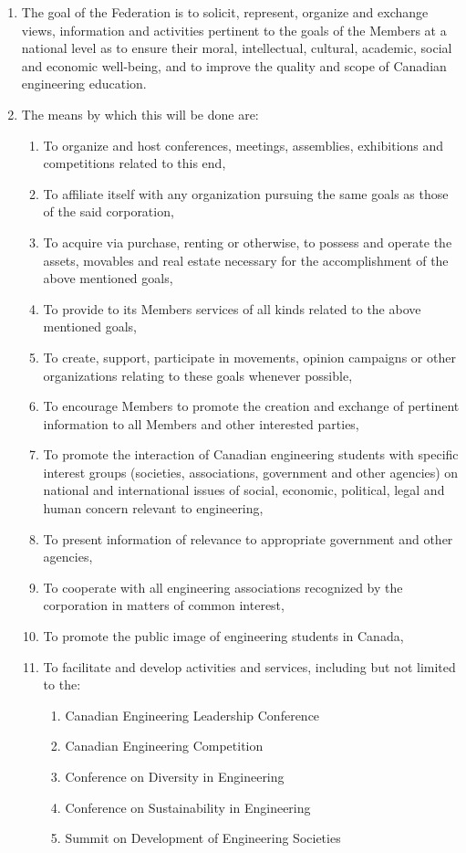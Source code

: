\begin{enumerate}
 \item The goal of the Federation is to solicit, represent, organize and exchange views, information and activities pertinent to the goals of the Members at a national level as to ensure their moral, intellectual, cultural, academic, social and economic well-being, and to improve the quality and scope of Canadian engineering education.
 \item The means by which this will be done are:
  \begin{enumerate}
   \item To organize and host conferences, meetings, assemblies, exhibitions and competitions related to this end,
   \item To affiliate itself with any organization pursuing the same goals as those of the said corporation,
   \item To acquire via purchase, renting or otherwise, to possess and operate the assets, movables and real estate necessary for the accomplishment of the above mentioned goals,
   \item To provide to its Members services of all kinds related to the above mentioned goals,
   \item To create, support, participate in movements, opinion campaigns or other organizations relating to these goals whenever possible,
   \item To encourage Members to promote the creation and exchange of pertinent information to all Members and other interested parties,
   \item To promote the interaction of Canadian engineering students with specific interest groups (societies, associations, government and other agencies) on national and international issues of social, economic, political, legal and human concern relevant to engineering,
   \item To present information of relevance to appropriate government and other agencies,
   \item To cooperate with all engineering associations recognized by the corporation in matters of common interest,
   \item To promote the public image of engineering students in Canada,
   \item To facilitate and develop activities and services, including but not limited to the:
    \begin{enumerate}
     \item Canadian Engineering Leadership Conference
     \item Canadian Engineering Competition
     \item Conference on Diversity in Engineering
     \item Conference on Sustainability in Engineering
     \item Summit on Development of Engineering Societies
    \end{enumerate}
  \end{enumerate}
\end{enumerate}

